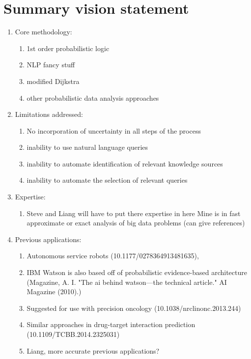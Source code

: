 \documentclass[11pt,notitlepage]{article}
\begin{document}
\section{Summary vision statement}
\begin{enumerate}
 \item Core methodology:
        \begin{enumerate}
        \item 1st order probabilistic logic
        \item NLP fancy stuff
        \item modified Dijkstra
        \item other probabilistic data analysis approaches
  		\end{enumerate}
 \item Limitations addressed:
        \begin{enumerate}
        \item No incorporation of uncertainty in all steps of the process
        \item inability to use natural language queries
        \item inability to automate identification of relevant knowledge sources
        \item inability to automate the selection of relevant queries
        \end{enumerate}
 \item Expertise:
 		\begin{enumerate}
        \item Steve and Liang will have to put there expertise in here
        Mine is in fast approximate or exact analysis of big data problems (can give references)
        \end{enumerate}
 \item Previous applications:
 		\begin{enumerate}
        \item Autonomous service robots (10.1177/0278364913481635),
        \item IBM Watson is also based off of probabilistic evidence-based architecture (Magazine, A. I. "The ai behind watson—the technical article." AI Magazine (2010).)
        \item Suggested for use with precision oncology (10.1038/nrclinonc.2013.244)
        \item Similar approaches in drug-target interaction prediction (10.1109/TCBB.2014.2325031)
        \item Liang, more accurate previous applications?
        \end{enumerate}
\end{enumerate}
\end{document}
